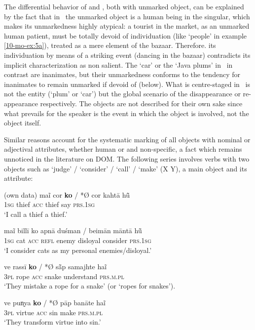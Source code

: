 \documentclass[output=paper]{LSP/langsci}
\begin{document}
The differential behavior of  and , both with unmarked object, can be explained by the fact that in~ the unmarked object is a human being in the singular, which makes its unmarkedness highly atypical: a tourist in the market, as an unmarked human patient, must be totally devoid of individuation (like ‘people’ in example \ref{10-mo-ex:5a}), treated as a mere element of the bazaar. Therefore. its individuation by means of a striking event (dancing in the bazaar) contradicts its implicit characterization as non salient. The ‘car’ or the ‘Java plums’ in~ in contrast are  inanimates, but their unmarkedness conforms to the tendency for inanimates to remain unmarked if devoid of  (\cf below). What is centre-staged in~ is not the entity (‘plum’ or ‘car’) but the global scenario of the disappearance or re-appearance respectively. The objects are not described for their own sake since what prevails for the speaker is the event in which the object is involved, not the object itself.

Similar reasons account for the systematic marking of all objects with nominal or adjectival attributes, whether human or  and non-specific, a fact which remains unnoticed in the literature on  DOM. The following series  involves verbs with two objects such as ‘judge’ / ‘consider’ / ‘call’ / ‘make’ (X Y), a main object and its attribute:

\ea {} (own data) 
\label{10-mo-ex:12}
\ea
\gll maĩ cor \textbf{ko} / *Ø cor kahtā hū̃\\
\textsc{1sg} thief \textsc{acc} { } { } thief say \textsc{prs.1sg}\\
\glt ‘I call a thief a thief.’

\ex
\gll maĩ billī ko apnā duśman / beimān māntā hū̃\\
\textsc{1sg} cat \textsc{acc} \textsc{refl} enemy { } disloyal consider \textsc{prs.1sg}\\
\glt ‘I consider cats as my personal enemies/disloyal.’

\ex
\gll ve rassī \textbf{ko} / *Ø sā̃p	 samajhte haĩ\\
\textsc{3pl} rope \textsc{acc} { } { }  snake understand \textsc{prs.m.pl}\\
\glt ‘They mistake a rope for a snake’ (or {‘}ropes for snakes’).

\ex
\gll ve pun̩ya \textbf{ko} / *Ø pāp banāte haĩ\\
\textsc{3pl} virtue \textsc{acc} { } { } sin make \textsc{prs.m.pl}\\
\glt ‘They transform virtue into sin{.’}
\z
\z
\end{document}
